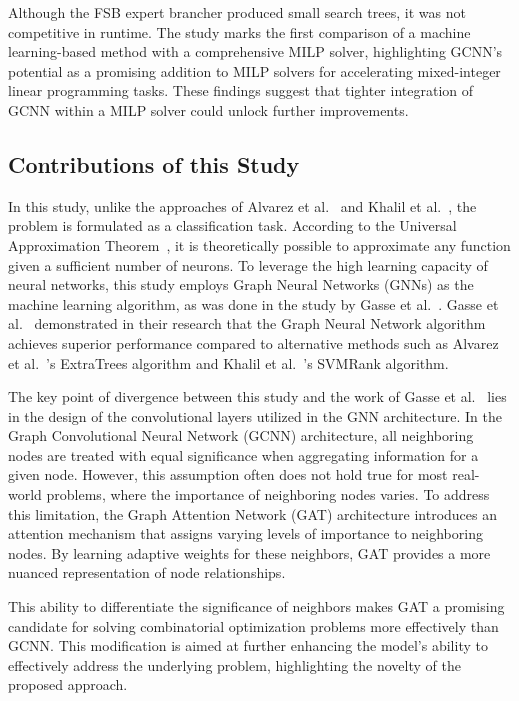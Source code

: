 Although the FSB expert brancher produced small search trees, it was not competitive in runtime.
The study marks the first comparison of a machine learning-based method with a comprehensive MILP solver, highlighting GCNN's potential as a promising addition to MILP solvers for accelerating mixed-integer linear programming tasks.
These findings suggest that tighter integration of GCNN within a MILP solver could unlock further improvements.



\subsection{Contributions of this Study}
In this study, unlike the approaches of Alvarez et al.~\cite{alvarezMachineLearningBasedApproximation2017} and Khalil et al.~\cite{khalilLearningBranchMixed2016}, the problem is formulated as a classification task.
According to the Universal Approximation Theorem~\cite{luUniversalApproximationTheorem2020}, it is theoretically possible to approximate any function given a sufficient number of neurons.
To leverage the high learning capacity of neural networks, this study employs Graph Neural Networks (GNNs) as the machine learning algorithm, as was done in the study by Gasse et al.~\cite{gasseExactCombinatorialOptimization2019}.
Gasse et al.~\cite{gasseExactCombinatorialOptimization2019} demonstrated in their research that the Graph Neural Network algorithm achieves superior performance compared to alternative methods such as Alvarez et al.~\cite{alvarezMachineLearningBasedApproximation2017}’s ExtraTrees algorithm and Khalil et al.~\cite{khalilLearningBranchMixed2016}’s SVMRank algorithm.


The key point of divergence between this study and the work of Gasse et al.~\cite{gasseExactCombinatorialOptimization2019} lies in the design of the convolutional layers utilized in the GNN architecture.
In the Graph Convolutional Neural Network (GCNN) architecture, all neighboring nodes are treated with equal significance when aggregating information for a given node.
However, this assumption often does not hold true for most real-world problems, where the importance of neighboring nodes varies.
To address this limitation, the Graph Attention Network (GAT) architecture introduces an attention mechanism that assigns varying levels of importance to neighboring nodes.
By learning adaptive weights for these neighbors, GAT provides a more nuanced representation of node relationships.


This ability to differentiate the significance of neighbors makes GAT a promising candidate for solving combinatorial optimization problems more effectively than GCNN.
This modification is aimed at further enhancing the model's ability to effectively address the underlying problem, highlighting the novelty of the proposed approach.